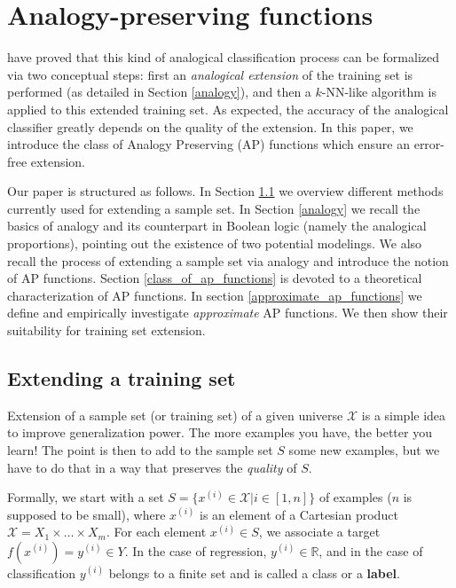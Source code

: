 \chapter{Analogy-preserving functions}

\cite{HugPraRicSerECAI16} have proved that this kind of analogical
classification process can be formalized via two conceptual steps: first an
{\it analogical  extension} of the training set is performed (as detailed in
Section \ref{analogy}), and then a $k$-NN-like algorithm is applied to this
extended training set.  As expected, the accuracy of the analogical classifier
greatly depends on the quality of the extension. In this  paper, we introduce
the class of Analogy Preserving (AP) functions which ensure an error-free
extension.

Our paper is structured as follows. In Section \ref{extending} we overview
different methods currently used for extending a sample set.  In Section
\ref{analogy} we recall the basics of analogy and its counterpart in Boolean
logic (namely the analogical proportions), pointing out the existence of two
potential modelings. We also recall the process of
extending a sample set via analogy and introduce the notion of AP functions.
Section \ref{class_of_ap_functions} is devoted to a theoretical
characterization of AP functions. In section \ref{approximate_ap_functions} we
define and empirically investigate \textit{approximate} AP functions. We then
show their suitability for training set extension.

\section{Extending a training set}\label{extending}
Extension of a sample set (or training set) of a given universe $\mathcal{X}$
is a simple idea to improve generalization power. The more examples you have,
the better you learn! The point is then to add to the sample set $S$ some new
examples, but we have to do that in a way that preserves the \textit{quality}
of $S$.

Formally, we start with a set $S= \{x^{(i)} \in \mathcal{X}| i \in [1,n]\}$ of
examples ($n$ is supposed to be small), where $x^{(i)}$ is an
element of a Cartesian product $\mathcal{X} = X_1 \times \ldots \times X_m$.
For each element  $x^{(i)} \in S$, we associate a target  $f(x^{(i)})=y^{(i)}
\in Y$.  In the case of regression, $y^{(i)} \in \mathbb{R}$, and in the case
of classification $y^{(i)}$ belongs to a finite set and is called a class
or a \textbf{label}.

